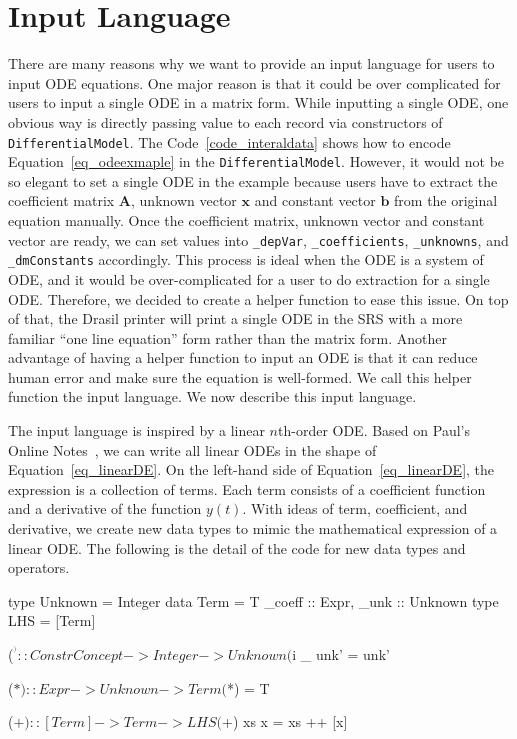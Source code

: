 \section{Input Language}
\label{sec_input}
There are many reasons why we want to provide an input language for users to input ODE equations. One major reason is that it could be over complicated for users to input a single ODE in a matrix form. While inputting a single ODE, one obvious way is directly passing value to each record via constructors of \verb|DifferentialModel|. The Code~\ref{code_interaldata} shows how to encode Equation~\ref{eq_odeexmaple} in the \verb|DifferentialModel|. However, it would not be so elegant to set a single ODE in the example because users have to extract the coefficient matrix $\boldsymbol{A}$, unknown vector $\boldsymbol{x}$ and constant vector $\boldsymbol{b}$ from the original equation manually. Once the coefficient matrix, unknown vector and constant vector are ready, we can set values into \verb|_depVar|, \verb|_coefficients|, \verb|_unknowns|, and \verb|_dmConstants| accordingly. This process is ideal when the ODE is a system of ODE, and it would be over-complicated for a user to do extraction for a single ODE. Therefore, we decided to create a helper function to ease this issue. On top of that, the Drasil printer will print a single ODE in the SRS with a more familiar ``one line equation'' form rather than the matrix form. Another advantage of having a helper function to input an ODE is that it can reduce human error and make sure the equation is well-formed. We call this helper function the input language. We now describe this input language.

The input language is inspired by a linear $n$th-order ODE. Based on Paul's Online Notes~\citep{paullinearode}, we can write all linear ODEs in the shape of Equation~\ref{eq_linearDE}. On the left-hand side of Equation~\ref{eq_linearDE}, the expression is a collection of terms. Each term consists of a coefficient function and a derivative of the function $y(t)$. With ideas of term, coefficient, and derivative, we create new data types to mimic the mathematical expression of a linear ODE. The following is the detail of the code for new data types and operators.

\begin{haskell1}
type Unknown = Integer
data Term = T{
	_coeff :: Expr,
	_unk :: Unknown
}
type LHS = [Term]

($^^) :: ConstrConcept -> Integer -> Unknown
($^^) _ unk' = unk'

($*) :: Expr -> Unknown -> Term
($*) = T

($+) :: [Term] -> Term -> LHS
($+) xs x  = xs ++ [x]
\end{haskell1}

